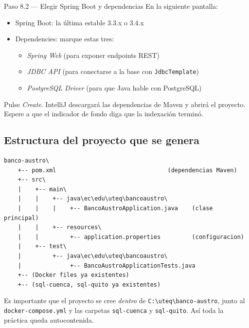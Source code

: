 \documentclass[11pt,a4paper]{article}
\begin{document}
\begin{pasobox}{Paso 8.2 --- Elegir Spring Boot y dependencias}
En la siguiente pantalla:

\begin{itemize}[leftmargin=1.2em]
    \item Spring Boot: la \'ultima estable 3.3.x o 3.4.x
    \item Dependencies: marque estas tres:
    \begin{itemize}
        \item \emph{Spring Web} (para exponer endpoints REST)
        \item \emph{JDBC API} (para conectarse a la base con \texttt{JdbcTemplate})
        \item \emph{PostgreSQL Driver} (para que Java hable con PostgreSQL)
    \end{itemize}
\end{itemize}

Pulse \emph{Create}. IntelliJ descargar\'a las dependencias de Maven y abrir\'a el proyecto. Espere a que el indicador de fondo diga que la indexaci\'on termin\'o.
\end{pasobox}

\subsection{Estructura del proyecto que se genera}

\begin{lstlisting}[style=plainstyle,caption={Estructura Maven t\'ipica de Spring Boot}]
banco-austro\
    +-- pom.xml                                (dependencias Maven)
    +-- src\
    |    +-- main\
    |    |    +-- java\ec\edu\uteq\bancoaustro\
    |    |    |    +-- BancoAustroApplication.java    (clase principal)
    |    |    +-- resources\
    |    |         +-- application.properties         (configuracion)
    |    +-- test\
    |         +-- java\ec\edu\uteq\bancoaustro\
    |              +-- BancoAustroApplicationTests.java
    +-- (Docker files ya existentes)
    +-- (sql-cuenca, sql-quito ya existentes)
\end{lstlisting}

\begin{notabox}
Es importante que el proyecto se cree \emph{dentro} de \texttt{C:\textbackslash uteq\textbackslash banco-austro}, junto al \texttt{docker-compose.yml} y las carpetas \texttt{sql-cuenca} y \texttt{sql-quito}. As\'i toda la pr\'actica queda autocontenida.
\end{notabox}
\end{document}
